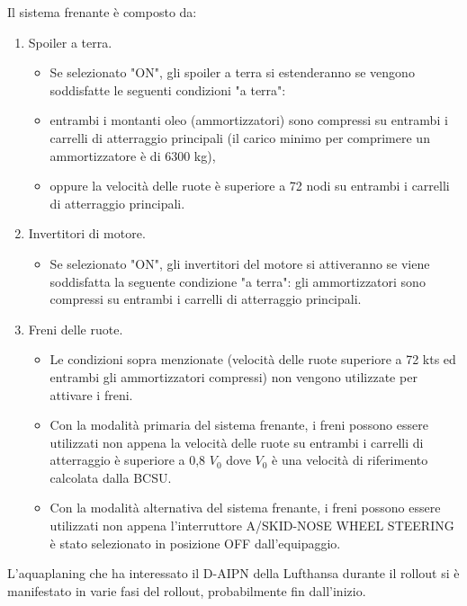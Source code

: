 Il sistema frenante è composto da:

\begin{enumerate}
	\item  Spoiler a terra.
	
	\begin{itemize}
		\item Se selezionato "ON", gli spoiler a terra si estenderanno se vengono soddisfatte le seguenti condizioni "a terra":
		
		\item entrambi i montanti oleo (ammortizzatori) sono compressi su entrambi i carrelli di atterraggio principali (il carico minimo per comprimere un ammortizzatore è di 6300 kg),
		
		\item oppure la velocità delle ruote è superiore a 72 nodi su entrambi i carrelli di atterraggio principali.
	\end{itemize}
	
	\item  Invertitori di motore.
	
	\begin{itemize}
		\item Se selezionato "ON", gli invertitori del motore si attiveranno se viene soddisfatta la seguente condizione "a terra": gli ammortizzatori sono compressi su entrambi i carrelli di atterraggio principali.
	\end{itemize}
	
	\item  Freni delle ruote.
	\begin{itemize}
		
		\item Le condizioni sopra menzionate (velocità delle ruote superiore a 72 kts ed entrambi gli ammortizzatori compressi) non vengono utilizzate per attivare i freni.
		
		\item Con la modalità primaria del sistema frenante, i freni possono essere utilizzati non appena la velocità delle ruote su entrambi i carrelli di atterraggio è superiore a 0,8 $V_0$ dove $V_0$ è una velocità di riferimento calcolata dalla BCSU.
		
		\item Con la modalità alternativa del sistema frenante, i freni possono essere utilizzati non appena l'interruttore A/SKID-NOSE WHEEL STEERING è stato selezionato in posizione OFF dall'equipaggio.
	\end{itemize}
\end{enumerate}
L'aquaplaning che ha interessato il D-AIPN della Lufthansa durante il rollout si è manifestato in varie fasi del rollout, probabilmente fin dall'inizio.

